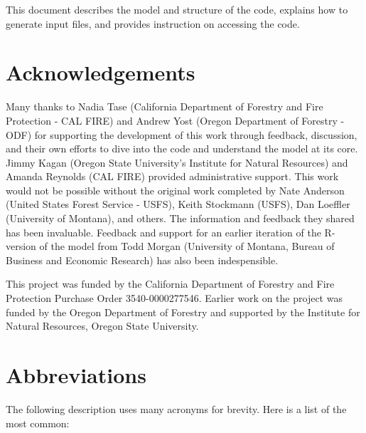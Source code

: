 \documentclass[
  openany]{book}
\begin{document}
This document describes the model and structure of the code, explains how to generate input files, and provides instruction on accessing the code.

\hypertarget{sum-ack}{%
\section{Acknowledgements}\label{sum-ack}}

Many thanks to Nadia Tase (California Department of Forestry and Fire Protection - CAL FIRE) and Andrew Yost (Oregon Department of Forestry - ODF) for supporting the development of this work through feedback, discussion, and their own efforts to dive into the code and understand the model at its core. Jimmy Kagan (Oregon State University's Institute for Natural Resources) and Amanda Reynolds (CAL FIRE) provided administrative support. This work would not be possible without the original work completed by Nate Anderson (United States Forest Service - USFS), Keith Stockmann (USFS), Dan Loeffler (University of Montana), and others. The information and feedback they shared has been invaluable. Feedback and support for an earlier iteration of the R-version of the model from Todd Morgan (University of Montana, Bureau of Business and Economic Research) has also been indespensible.

This project was funded by the California Department of Forestry and Fire Protection Purchase Order 3540-0000277546. Earlier work on the project was funded by the Oregon Department of Forestry and supported by the Institute for Natural Resources, Oregon State University.

\hypertarget{sum-abb}{%
\section{Abbreviations}\label{sum-abb}}

The following description uses many acronyms for brevity. Here is a list of the most common:
\end{document}

